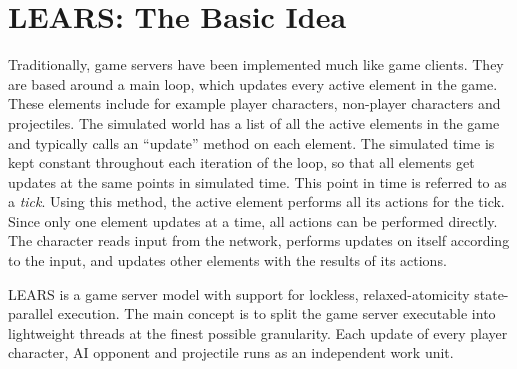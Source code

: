 \section{LEARS: The Basic Idea}\label{sec:concept}
Traditionally, game servers have been implemented much like game
clients. They are based around a main loop, which updates every active
element in the game. These elements include for example player
characters, non-player characters and projectiles. The simulated world
has a list of all the active elements in the game and typically calls
an ``update'' method on each element. The simulated time is kept
constant throughout each iteration of the loop, so that all elements get updates at the same points in simulated time. This point in
time is referred to as a \textit{tick}.  Using this method, the active
element performs all its actions for the tick. Since only one
element updates at a time, all actions can be performed directly. The
character reads input from the network, performs updates on itself
according to the input, and updates other elements with the results of
its actions.

%
LEARS is a game server model with support for lockless, relaxed-atomicity
state-parallel execution.  The main concept is to split the
game server executable into lightweight threads at the finest possible
granularity. Each update of every player character, AI opponent and
projectile runs as an independent work unit. 
%

